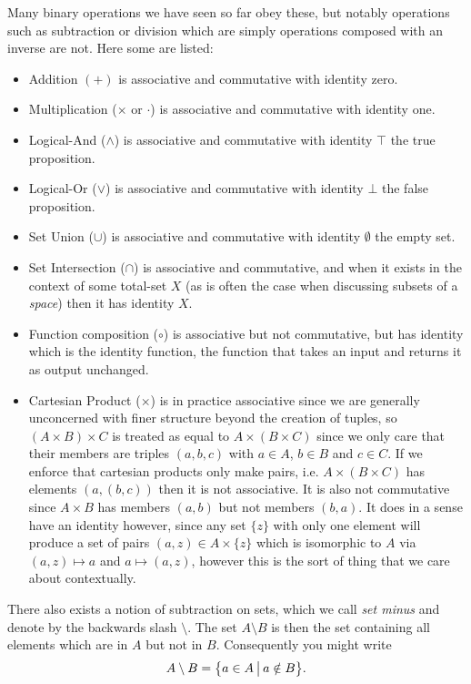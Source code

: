\documentclass[11pt]{article}
\begin{document}
Many binary operations we have seen so far obey these, but notably operations such as subtraction or division which are simply operations composed with an inverse are not. Here some are listed: \begin{itemize}
\item Addition $(+)$ is associative and commutative with identity zero.
\item Multiplication ($\times$ or $\cdot$) is associative and commutative with identity one.
\item Logical-And ($\wedge$) is associative and commutative with identity $\top$ the true proposition.
\item Logical-Or ($\vee$) is associative and commutative with identity $\bot$ the false proposition.
\item Set Union ($\cup$) is associative and commutative with identity $\emptyset$ the empty set.
\item Set Intersection ($\cap$) is associative and commutative, and when it exists in the context of some total-set $X$ (as is often the case when discussing subsets of a \emph{space}) then it has identity $X$.
\item Function composition ($\circ$) is associative but not commutative, but has identity which is the identity function, the function that takes an input and returns it as output unchanged.
\item Cartesian Product ($\times$) is in practice associative since we are generally unconcerned with finer structure beyond the creation of tuples, so $(A \times B) \times C$ is treated as equal to $A \times (B \times C)$ since we only care that their members are triples $(a,b,c)$ with $a \in A$, $b\in B$ and $c \in C$. If we enforce that cartesian products only make pairs, i.e. $A \times (B\times C)$ has elements $(a , (b,c))$ then it is not associative. It is also not commutative since $A \times B$ has members $(a,b)$ but not members $(b,a)$. It does in a sense have an identity however, since any set $\{z\}$ with only one element will produce a set of pairs $(a,z) \in A \times \{z\}$ which is isomorphic to $A$ via $(a,z) \mapsto a$ and $a \mapsto (a,z)$, however this is the sort of thing that we care about contextually.
\end{itemize}

There also exists a notion of subtraction on sets, which we call \emph{set minus} and denote by the backwards slash $\setminus$. The set $A \setminus B$ is then the set containing all elements which are in $A$ but not in $B$. Consequently you might write \begin{gather*}
A \setminus B = \big\{ a \in A \hspace{0.2em}\big| \hspace{0.2em} a \notin B \big\}.
\end{gather*}
\end{document}
